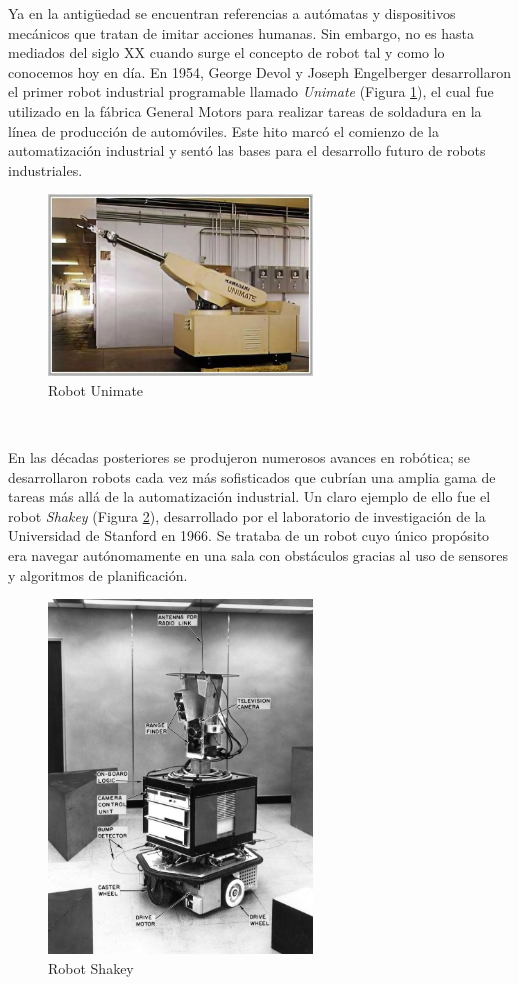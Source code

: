 Ya en la antigüedad se encuentran referencias a autómatas y dispositivos mecánicos  
que tratan de imitar acciones humanas. Sin embargo, no es hasta mediados del siglo XX cuando surge el concepto de robot tal y como lo conocemos hoy en día. 
En 1954, George Devol y Joseph Engelberger desarrollaron el primer robot industrial programable llamado \textit{Unimate} (Figura \ref{fig:unimate}), el cual fue utilizado en la fábrica General Motors 
para realizar tareas de soldadura en la línea de producción de automóviles. Este hito marcó el comienzo de la automatización industrial y sentó las bases para 
el desarrollo futuro de robots industriales.\\
\begin{figure} [ht!]
  \begin{center}
    \includegraphics[width=7cm]{figs/unimate.jpg}
  \end{center}
  \caption{Robot Unimate}
  \label{fig:unimate}
\end{figure}\ 

En las décadas posteriores se produjeron numerosos avances en robótica; se desarrollaron robots cada vez más sofisticados que cubrían una amplia gama de tareas más allá de la 
automatización industrial. Un claro ejemplo de ello fue el robot \textit{Shakey} (Figura \ref{fig:shakey}), desarrollado por el laboratorio de investigación de la Universidad de Stanford en 1966. Se trataba 
de un robot cuyo único propósito era navegar autónomamente en una sala con obstáculos gracias al uso de sensores y algoritmos de planificación.\\
\begin{figure} [ht!]
  \begin{center}
    \includegraphics[width=7cm]{figs/shakey.jpg}
  \end{center}
  \caption{Robot Shakey}
  \label{fig:shakey}
\end{figure}\

